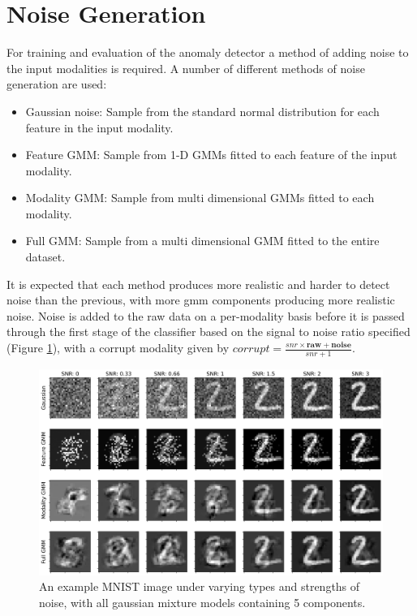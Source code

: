 \section{Noise Generation}
For training and evaluation of the anomaly detector a method of adding noise to the input modalities is required. A number of different methods of noise generation are used:
\begin{itemize}
    \item Gaussian noise: Sample from the standard normal distribution for each feature in the input modality.
    \item Feature GMM: Sample from 1-D GMMs fitted to each feature of the input modality.
    \item Modality GMM: Sample from multi dimensional GMMs fitted to each modality.
    \item Full GMM: Sample from a multi dimensional GMM fitted to the entire dataset.
\end{itemize}
It is expected that each method produces more realistic and harder to detect noise than the previous, with more gmm components producing more realistic noise. Noise is added to the raw data on a per-modality basis before it is passed through the first stage of the classifier based on the signal to noise ratio specified (Figure \ref{fig:noise}), with a corrupt modality given by $corrupt = \frac{snr\times \mathbf{raw} + \mathbf{noise}}{snr + 1}$.

\begin{figure}[H]
    \centering\captionsetup{width=.8\linewidth}
    \includegraphics[width=.9\textwidth]{images/noise.png}
    \caption{An example MNIST image under varying types and strengths of noise, with all gaussian mixture models containing 5 components.}
    \label{fig:noise}
\end{figure}

